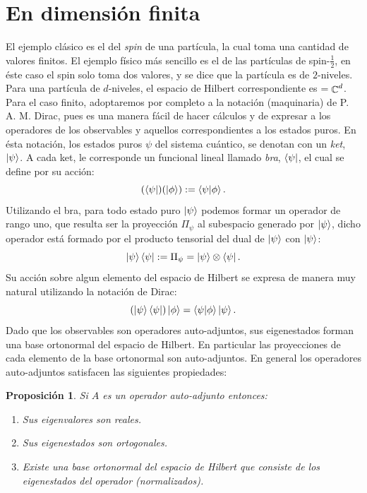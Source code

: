 \documentclass[a4paper]{report}
\DeclareMathOperator{\C}{\mathbb{C}}
\let\H\relax
\DeclareMathOperator{\H}{\mathcal H}
\newtheorem{proposition}{Proposición}
\begin{document}
  \section{En dimensión finita}

  El ejemplo clásico es el del \textit{spin} de una
  partícula, la cual toma una cantidad de valores finitos.
  El ejemplo físico más sencillo es el de las partículas de
  spin-$\frac{1}{2}$, en éste caso el spin solo toma dos
  valores, y se dice que la partícula es de $2$-niveles.
  Para una partícula de $d$-niveles, el espacio de Hilbert
  correspondiente es $\H  = \C^{d}$. Para el caso finito,
  adoptaremos por completo a la notación (maquinaria) de P.
  A. M. Dirac, pues es una manera fácil de hacer cálculos y
  de expresar a los operadores de los observables y aquellos
  correspondientes a los estados puros. En ésta notación,
  los estados puros $\psi$ del sistema cuántico, se denotan
  con un \textit{ket}, $\ket \psi$. A cada ket, le
  corresponde un funcional lineal llamado \textit{bra},
  $\bra \psi$, el cual se define por su acción:
  \[
    (\bra \psi)(\ket{\phi})
    := \braket{\psi|\phi}.
  \] 
  Utilizando el bra, para todo estado puro $\ket{\psi}$
  podemos formar un operador de rango uno, que resulta ser
  la proyección $\Pi_\psi$ al subespacio generado por
  $\ket{\psi}$, dicho operador está formado por el producto
  tensorial del dual de $\ket{\psi}$ con $\ket{\psi}$:
  \begin{equation}
    \ket \psi \bra \psi
    := \Pi_\psi
    = \ket \psi \otimes \bra \psi.
  \end{equation} 
  Su acción sobre algun elemento del espacio de Hilbert se
  expresa de manera muy natural utilizando la notación de
  Dirac:
  \[
    \left(\ket \psi \bra \psi\right) \ket \phi
    = \braket{\psi|\phi} \ket \psi.
  \] 
  Dado que los observables son operadores auto-adjuntos, sus
  eigenestados forman una base ortonormal del espacio de
  Hilbert. En particular las proyecciones de cada elemento
  de la base ortonormal son auto-adjuntos. En general los
  operadores auto-adjuntos satisfacen las siguientes
  propiedades:
  \begin{proposition}
    Si $A$ es un operador auto-adjunto entonces:
    \begin{enumerate}
      \item Sus eigenvalores son reales.
      \item Sus eigenestados son ortogonales.
      \item Existe una base ortonormal del espacio de
        Hilbert que consiste de los eigenestados del
        operador (normalizados).
    \end{enumerate}
  \end{proposition}
\end{document}
